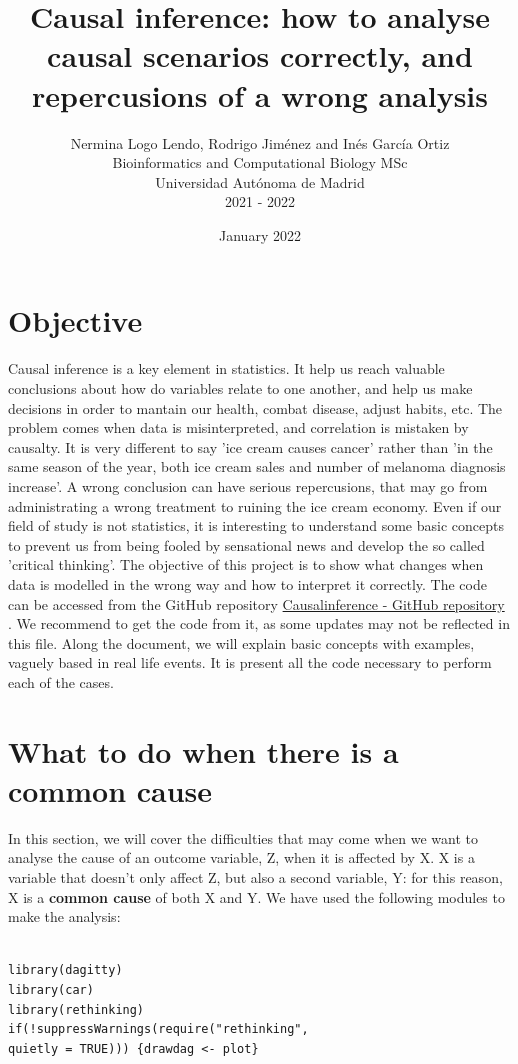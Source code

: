 \documentclass{article}
\title{Causal inference: how to analyse causal scenarios correctly, and repercusions of a wrong analysis}
\author{Nermina Logo Lendo, Rodrigo Jiménez and Inés García Ortiz\\
      Bioinformatics and Computational Biology MSc\\
      Universidad Autónoma de Madrid\\
      2021 - 2022}
\date{January 2022}
\begin{document}
\maketitle
\tableofcontents
\newpage
\section{Objective}

Causal inference is a key element in statistics. It help us reach valuable conclusions about how do variables relate to one another, and help us make decisions in order to mantain our health, combat disease, adjust habits, etc. The problem comes when data is misinterpreted, and correlation is mistaken by causalty. It is very different to say 'ice cream causes cancer' rather than 'in the same season of the year, both ice cream sales and number of melanoma diagnosis increase'. A wrong conclusion can have serious repercusions, that may go from administrating a wrong treatment to ruining the ice cream economy. Even if our field of study is not statistics, it is interesting to understand some basic concepts to prevent us from being fooled by sensational news and develop the so called 'critical thinking'. 
The objective of this project is to show what changes when data is modelled in the wrong way and how to interpret it correctly. The code can be accessed from the GitHub repository \href{https://github.com/igarcia17/causal_inference}{Causalinference - GitHub repository} . We recommend to get the code from it, as some updates may not be reflected in this file.
Along the document, we will explain basic concepts with examples, vaguely based in real life events. It is present all the code necessary to perform each of the cases.

\newpage

\section{What to do when there is a common cause}

In this section, we will cover the difficulties that may come when we want to analyse the cause of an outcome variable, Z, when it is affected by X. X is a variable that doesn't only affect Z, but also a second variable, Y: for this reason, X is a \textbf{common cause} of both X and Y.
We have used the following modules to make the analysis:

\begin{lstlisting}

library(dagitty)
library(car)
library(rethinking)
if(!suppressWarnings(require("rethinking", 
quietly = TRUE))) {drawdag <- plot}
  
\end{lstlisting}
\end{document}
